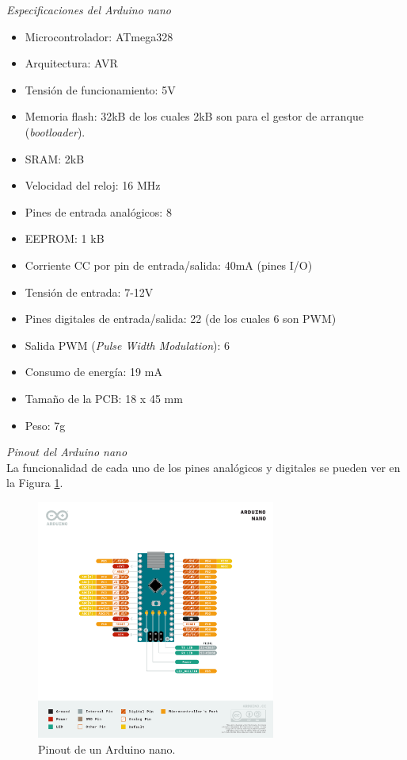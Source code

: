 \documentclass[12pt]{article}
\begin{document}
	\noindent \textit{Especificaciones del Arduino nano} \\
	
	\begin{itemize}
		\item Microcontrolador: ATmega328
		\item Arquitectura: AVR
		\item Tensión de funcionamiento: 5V
		\item Memoria flash: 32kB de los cuales 2kB son para el gestor de arranque (\textit{bootloader}).
		\item SRAM: 2kB
		\item Velocidad del reloj: 16 MHz
		\item Pines de entrada analógicos: 8
		\item EEPROM: 1 kB
		\item Corriente CC por pin de entrada/salida: 40mA (pines I/O)
		\item Tensión de entrada: 7-12V
		\item Pines digitales de entrada/salida: 22 (de los cuales 6 son PWM)
		\item Salida PWM (\textit{Pulse Width Modulation}): 6
		\item Consumo de energía: 19 mA
		\item Tamaño de la PCB: 18 x 45 mm
		\item Peso: 7g
	\end{itemize}
	
	\noindent \textit{Pinout del Arduino nano} \\
	
	\noindent La funcionalidad de cada uno de los pines analógicos y digitales se pueden ver en la Figura \ref{Pinout Arduino nano}. \\
	
	\begin{figure}[h]
		\begin{center}
			\includegraphics[width=0.7\textwidth]{img/Pinout-NANO_official.png}
			\caption{Pinout de un Arduino nano.}
			\label{Pinout Arduino nano}
		\end{center}
	\end{figure}
\end{document}
